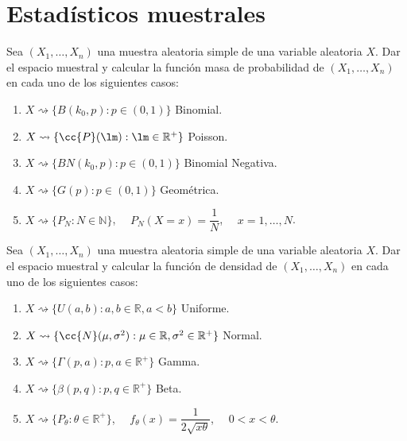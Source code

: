 \newpage
\section{Estadísticos muestrales}

\begin{ejercicio}
    Sea $(X_1, \ldots, X_n)$ una muestra aleatoria simple de una variable aleatoria $X$. Dar el espacio muestral y calcular la función masa de probabilidad de $(X_1, \ldots, X_n)$ en cada uno de los siguientes casos:
    \begin{enumerate}[label=\alph*)]
        \item $X\rightsquigarrow \{B(k_0,p) : p\in (0,1)\}$ Binomial.
        \item $X\rightsquigarrow\{\cc{P}(\lm) : \lm \in \mathbb{R}^+\}$ Poisson.
        \item $X\rightsquigarrow\{BN(k_0,p) : p\in (0,1)\}$ Binomial Negativa.
        \item $X\rightsquigarrow\{G(p) : p\in (0,1)\}$ Geométrica.
        \item $X\rightsquigarrow\{P_N : N\in \mathbb{N}\}$, $\quad P_N(X=x) = \dfrac{1}{N}$, $\quad x=1,\ldots,N$.
    \end{enumerate}
\end{ejercicio}

\begin{ejercicio}
    Sea $(X_1, \ldots, X_n)$ una muestra aleatoria simple de una variable aleatoria $X$. Dar el espacio muestral y calcular la función de densidad de $(X_1, \ldots, X_n)$ en cada uno de los siguientes casos:
    \begin{enumerate}[label=\alph*)]
        \item $X\rightsquigarrow\{U(a,b) : a,b\in \mathbb{R}, a<b\}$ Uniforme.
        \item $X\rightsquigarrow\{\cc{N}(\mu, \sigma^2) : \mu \in \mathbb{R}, \sigma^2 \in \mathbb{R}^+\}$ Normal.
        \item $X\rightsquigarrow\{\Gamma(p,a) : p,a\in \mathbb{R}^+\}$ Gamma.
        \item $X\rightsquigarrow\{\beta(p,q) : p,q\in \mathbb{R}^+\}$ Beta.
        \item $X\rightsquigarrow\{P_\theta : \theta \in \mathbb{R}^+\}$, $\quad f_\theta(x) = \dfrac{1}{2\sqrt{x\theta}}$, $\quad 0<x<\theta$.
    \end{enumerate}
\end{ejercicio}

